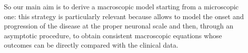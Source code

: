 So our main aim is to derive a macroscopic model starting from a microscopic one: this strategy is particularly relevant because allows to model the onset and progression of the disease at the proper neuronal scale and then, through an asymptotic procedure, to obtain consistent macroscopic equations whose outcomes can be directly compared with the clinical data.
